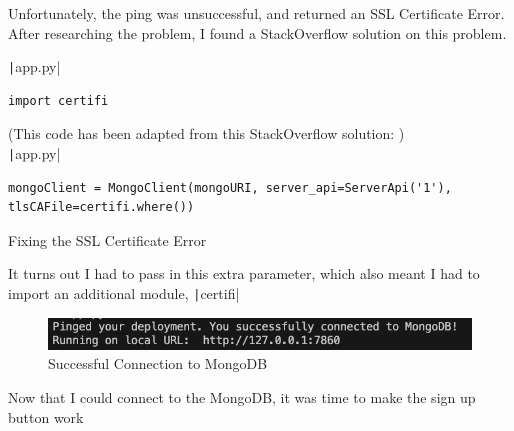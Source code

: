 \documentclass[12pt]{report}
\newcommand{\pil}[1]{\protect\texttt|#1|}
\begin{document}
Unfortunately, the ping was unsuccessful, and returned an SSL Certificate Error. After researching the problem, I found a StackOverflow solution \cite{stackOverflowFixSSL} on this problem.

\begin{listing}[H]
\pil{app.py}
\begin{verbatim}
import certifi
\end{verbatim}
(This code has been adapted from this StackOverflow solution: \cite{stackOverflowFixSSL}) \\
\pil{app.py}
\begin{verbatim}
mongoClient = MongoClient(mongoURI, server_api=ServerApi('1'), tlsCAFile=certifi.where())
\end{verbatim}
\caption{Fixing the SSL Certificate Error}\label{cs:fixSSL}
\end{listing}

It turns out I had to pass in this extra parameter, which also meant I had to import an additional module, \pil{certifi}

\begin{figure}[H]
\centering
\includegraphics[width=14cm]{ss15.5.png}
\caption{Successful Connection to MongoDB}\label{fig:ss15.5}
\end{figure}

\begin{center}
\end{center}

Now that I could connect to the MongoDB, it was time to make the sign up button work
\end{document}
